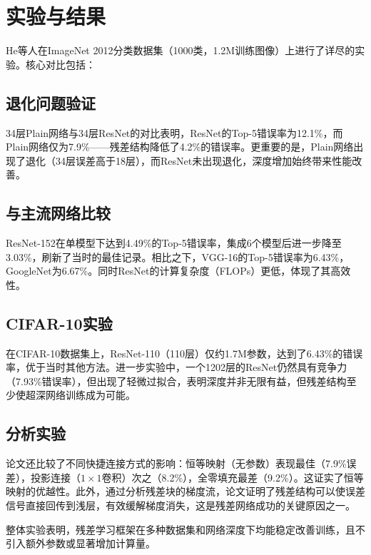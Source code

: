 \section{实验与结果}

He等人在ImageNet 2012分类数据集（1000类，1.2M训练图像）上进行了详尽的实验。核心对比包括：

\subsection{退化问题验证}
34层Plain网络与34层ResNet的对比表明，ResNet的Top-5错误率为12.1\%，而Plain网络仅为7.9\%——残差结构降低了4.2\%的错误率。更重要的是，Plain网络出现了退化（34层误差高于18层），而ResNet未出现退化，深度增加始终带来性能改善。

\subsection{与主流网络比较}
ResNet-152在单模型下达到4.49\%的Top-5错误率，集成6个模型后进一步降至3.03\%，刷新了当时的最佳记录。相比之下，VGG-16的Top-5错误率为6.43\%，GoogleNet为6.67\%。同时ResNet的计算复杂度（FLOPs）更低，体现了其高效性。

\subsection{CIFAR-10实验}
在CIFAR-10数据集上，ResNet-110（110层）仅约1.7M参数，达到了6.43\%的错误率，优于当时其他方法。进一步实验中，一个1202层的ResNet仍然具有竞争力（7.93\%错误率），但出现了轻微过拟合，表明深度并非无限有益，但残差结构至少使超深网络训练成为可能。

\subsection{分析实验}
论文还比较了不同快捷连接方式的影响：恒等映射（无参数）表现最佳（7.9\%误差），投影连接（$1\times1$卷积）次之（8.2\%），全零填充最差（9.2\%）。这证实了恒等映射的优越性。此外，通过分析残差块的梯度流，论文证明了残差结构可以使误差信号直接回传到浅层，有效缓解梯度消失，这是残差网络成功的关键原因之一。

整体实验表明，残差学习框架在多种数据集和网络深度下均能稳定改善训练，且不引入额外参数或显著增加计算量。